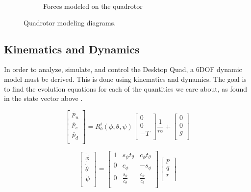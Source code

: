 \documentclass[12pt]{article}
\begin{document}
\begin{figure}[H]
\begin{subfigure}{0.50\textwidth}
		\caption{Forces modeled on the quadrotor}
		\label{fig:multirotor_forces}
	\end{subfigure}
	
	\caption{Quadrotor modeling diagrams.}
\end{figure}

\subsection{Kinematics and Dynamics}
In order to analyze, simulate, and control the Desktop Quad, a 6DOF dynamic model must be derived. This is done using kinematics and dynamics. The goal is to find the evolution equations for each of the quantities we care about, as found in the state vector above \cite{UAVBook}.

\singlespacing
\begin{equation}
\begin{bmatrix}
\ddot{p_n} \\
\ddot{p_e} \\
\ddot{p_d} \\
\end{bmatrix}
=
R_b^i(\phi, \theta, \psi)
\begin{bmatrix}
0  \\
0  \\
-T \\
\end{bmatrix}
\frac{1}{m} +
\begin{bmatrix}
0 \\
0 \\
g \\
\end{bmatrix}
\end{equation}
\doublespacing

\singlespacing
\begin{equation}
\begin{bmatrix}
\dot{\phi} \\
\dot{\theta} \\
\dot{\psi} \\
\end{bmatrix}
=
\begin{bmatrix}
1 & s_{\psi}t_{\theta} & c_{\phi}t_{\theta} \\
0 & c_{\phi}           & -s_{\phi}          \\
0 & \frac{s_{\phi}}{c_{\theta}} & \frac{c_{\phi}}{c_{\theta}} \\
\end{bmatrix}
\begin{bmatrix}
p \\
q \\
r \\
\end{bmatrix}
\end{equation}
\doublespacing
\end{document}
